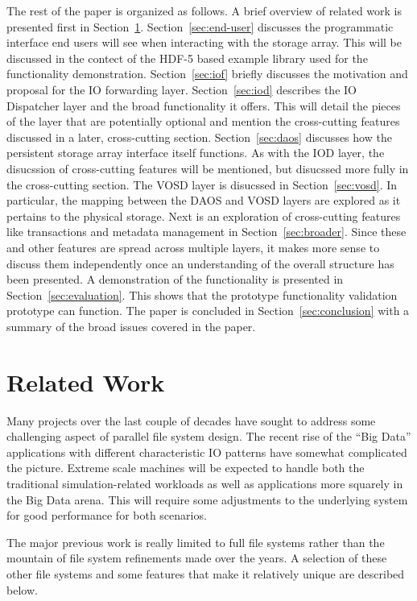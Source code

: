 \documentclass[conference]{IEEEtran}
\begin{document}
The rest of the paper is organized as follows. A brief overview of related work
is presented first in Section~\ref{sec:related}. Section~\ref{sec:end-user}
discusses the programmatic interface end users will see when interacting with
the storage array. This will be discussed in the contect of the HDF-5 based
example library used for the functionality demonstration. Section~\ref{sec:iof}
briefly discusses the motivation and proposal for the IO forwarding layer.
Section~\ref{sec:iod} describes the IO Dispatcher layer and the broad
functionality it offers. This will detail the pieces of the layer that are
potentially optional and mention the cross-cutting features discussed in a
later, cross-cutting section. Section~\ref{sec:daos} discusses how the
persistent storage array interface itself functions. As with the IOD layer, the
disucssion of cross-cutting features will be mentioned, but disucssed more
fully in the cross-cutting section. The VOSD layer is disucssed in
Section~\ref{sec:vosd}. In particular, the mapping between the DAOS and VOSD
layers are explored as it pertains to the physical storage. Next is an
exploration of cross-cutting features like transactions and metadata management
in Section~\ref{sec:broader}. Since these and other features are spread across
multiple layers, it makes more sense to discuss them independently once an
understanding of the overall structure has been presented.  A demonstration
of the functionality is presented in Section~\ref{sec:evaluation}. This shows
that the prototype functionality validation prototype can function. The paper
is concluded in Section~\ref{sec:conclusion} with a summary of the broad issues
covered in the paper.

\section{Related Work}
\label{sec:related}

Many projects over the last couple of decades have sought to address some
challenging aspect of parallel file system design. The recent rise of the ``Big
Data'' applications with different characteristic IO patterns have somewhat
complicated the picture. Extreme scale machines will be expected to handle both
the traditional simulation-related workloads as well as applications more
squarely in the Big Data arena. This will require some adjustments to the
underlying system for good performance for both scenarios.

The major previous work is really limited to full file systems rather than the
mountain of file system refinements made over the years. A selection of these
other file systems and some features that make it relatively unique are
described below.
\end{document}

